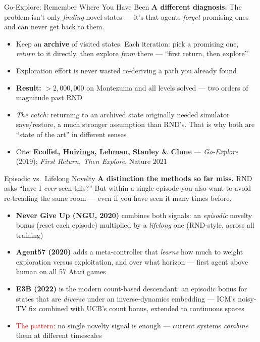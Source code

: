 \begin{frame}{Go-Explore: Remember Where You Have Been}
\textbf{A different diagnosis.} The problem isn't only \emph{finding} novel states --- it's that agents \emph{forget} promising ones and can never get back to them.
\vspace{0.4em}
\begin{itemize}
    \setlength{\itemsep}{0.5em}
    \item Keep an \textbf{archive} of visited states. Each iteration: pick a promising one, \emph{return} to it directly, then explore \emph{from} there --- ``first return, then explore''
    \item Exploration effort is never wasted re-deriving a path you already found
    \item \textbf{Result:} $>2{,}000{,}000$ on Montezuma and all levels solved --- two orders of magnitude past RND
    \item \emph{The catch:} returning to an archived state originally needed simulator save/restore, a much stronger assumption than RND's. That is why both are ``state of the art'' in different senses
    \item Cite: \textbf{Ecoffet, Huizinga, Lehman, Stanley \& Clune} --- \emph{Go-Explore} (2019); \emph{First Return, Then Explore}, Nature 2021
\end{itemize}
\end{frame}

\begin{frame}{Episodic vs.\ Lifelong Novelty}
\textbf{A distinction the methods so far miss.} RND asks ``have I \emph{ever} seen this?'' But within a single episode you also want to avoid re-treading the same room --- even if you have seen it many times before.
\vspace{0.4em}
\begin{itemize}
    \setlength{\itemsep}{0.5em}
    \item \textbf{Never Give Up (NGU, 2020)} combines both signals: an \emph{episodic} novelty bonus (reset each episode) multiplied by a \emph{lifelong} one (RND-style, across all training)
    \item \textbf{Agent57 (2020)} adds a meta-controller that \emph{learns} how much to weight exploration versus exploitation, and over what horizon --- first agent above human on all 57 Atari games
    \item \textbf{E3B (2022)} is the modern count-based descendant: an episodic bonus for states that are \emph{diverse} under an inverse-dynamics embedding --- ICM's noisy-TV fix combined with UCB's count bonus, extended to continuous spaces
    \item \textcolor{red}{The pattern:} no single novelty signal is enough --- current systems \emph{combine} them at different timescales
\end{itemize}
\end{frame}

